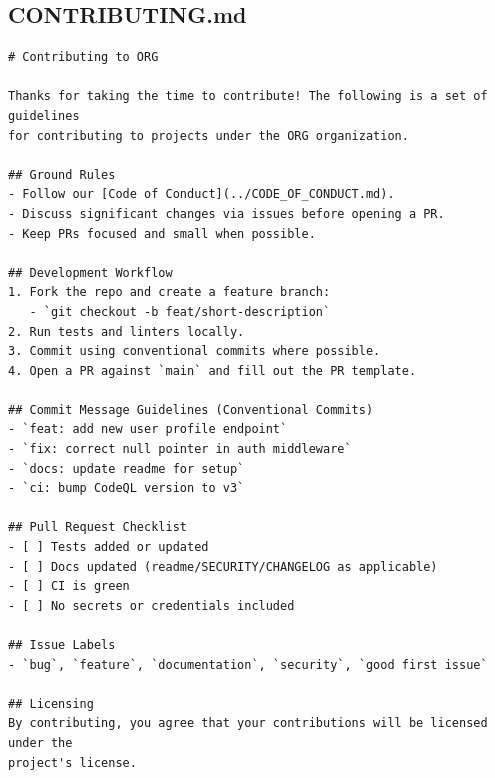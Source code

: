 \documentclass[11pt,letterpaper]{article}
\begin{document}
\subsection{CONTRIBUTING.md}
\begin{verbatim}
# Contributing to ORG

Thanks for taking the time to contribute! The following is a set of guidelines
for contributing to projects under the ORG organization.

## Ground Rules
- Follow our [Code of Conduct](../CODE_OF_CONDUCT.md).
- Discuss significant changes via issues before opening a PR.
- Keep PRs focused and small when possible.

## Development Workflow
1. Fork the repo and create a feature branch:
   - `git checkout -b feat/short-description`
2. Run tests and linters locally.
3. Commit using conventional commits where possible.
4. Open a PR against `main` and fill out the PR template.

## Commit Message Guidelines (Conventional Commits)
- `feat: add new user profile endpoint`
- `fix: correct null pointer in auth middleware`
- `docs: update readme for setup`
- `ci: bump CodeQL version to v3`

## Pull Request Checklist
- [ ] Tests added or updated
- [ ] Docs updated (readme/SECURITY/CHANGELOG as applicable)
- [ ] CI is green
- [ ] No secrets or credentials included

## Issue Labels
- `bug`, `feature`, `documentation`, `security`, `good first issue`

## Licensing
By contributing, you agree that your contributions will be licensed under the
project's license.
\end{verbatim}
\clearpage
\end{document}
